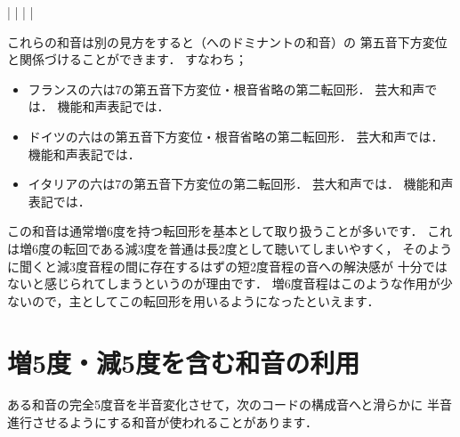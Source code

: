 \documentclass[dvipdfmx,uplatex,b5paper,openany,jbase=12Q,nomag*,textwidth-limit=44%
               ]{gachimuchi}
\begin{document}
\begin{Music}
  \generalmeter{\meterC}%
  \Startpiece
  \znotes%
  |%
  \en%
  \NOTes%
  |%
  \en\doublebar%
  \NOTes%
  |%
  \en\doublebar%
  \NOTes%
  |%
  \en\setdoublebar%
  \endpiece%
\end{Music}
\begin{Yodan}
  これらの和音は別の見方をすると\Gnii{}（\Gnv へのドミナントの和音）の
  第五音下方変位と関係づけることができます．
  すなわち；
  \begin{itemize}
    \item
      フランスの六は\Gnii\subsc7の第五音下方変位・根音省略の第二転回形．
      芸大和声では\onChordsc{\dAlt{\Slash{\Gnv}}}{\Gnv}．
      機能和声表記では．
    \item
      ドイツの六は\Gnii{}の第五音下方変位・根音省略の第二転回形．
      芸大和声では\onChordsc{\dAlt{\Slash{\Gnv}}}{\Gnv}．
      機能和声表記では．
    \item
      イタリアの六は\Gnii\subsc7の第五音下方変位の第二転回形．
      芸大和声では\onChordsc{\dAlt{\Gnv}}{\Gnv}．
      機能和声表記では．
  \end{itemize}
\end{Yodan}
\begin{Yodan}
  この和音は通常増6度を持つ転回形を基本として取り扱うことが多いです．
  これは増6度の転回である減3度を普通は長2度として聴いてしまいやすく，
  そのように聞くと減3度音程の間に存在するはずの短2度音程の音への解決感が
  十分ではないと感じられてしまうというのが理由です．
  増6度音程はこのような作用が少ないので，主としてこの転回形を用いるようになったといえます．
\end{Yodan}
\section{増5度・減5度を含む和音の利用}
ある和音の完全5度音を半音変化させて，次のコードの構成音へと滑らかに
半音進行させるようにする和音が使われることがあります．
\end{document}

